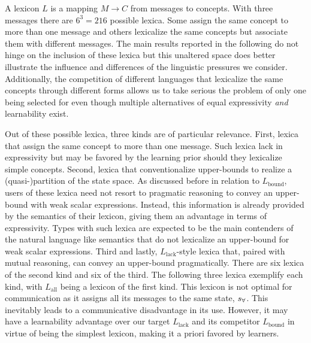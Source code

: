 \documentclass[a4paper, 11pt]{article}
\newcommand{\state}{\ensuremath{s}\xspace}		%
\newcommand{\mystate}[1]{\ensuremath{\state_{\text{#1}}}\xspace} %
\newcommand{\mylang}[1]{\ensuremath{L_{\text{#1}}}\xspace} %
\newcommand{\Messgs}{\ensuremath{M}\xspace}		%
\newcommand{\sall}{\mystate{\ensuremath{\forall}}}
\newcommand{\Lall}{\mylang{all}}
\newcommand{\Lbound}{\mylang{bound}}
\newcommand{\Llack}{\mylang{lack}}
\begin{document}
A lexicon $L$ is a mapping $\Messgs \rightarrow C$ from messages to concepts. With three
messages there are $6^3 = 216$ possible lexica. Some assign the same concept to more than one message and others lexicalize the same concepts but associate them with different messages. The main results reported in the following do not hinge on the inclusion of these lexica but this unaltered space does better illustrate the influence and differences of the linguistic pressures we consider. Additionally, the competition of different languages that lexicalize the same concepts through different forms allows us to take serious the problem of only one being selected for even though multiple alternatives of equal expressivity {\em and} learnability exist.

Out of these possible lexica, three kinds are of particular relevance. First, lexica that assign the same concept to more than one message. Such lexica lack in expressivity but may be favored by the learning prior should they lexicalize simple concepts. Second, lexica that conventionalize upper-bounds to realize a (quasi-)partition of the state space. As discussed before in relation to $\Lbound$, users of these lexica need not resort to pragmatic reasoning to convey an upper-bound with weak scalar expressions. Instead, this information is already provided by the semantics of their lexicon, giving them an advantage in terms of expressivity. Types with such lexica are expected to be the main contenders of the natural language like semantics that do not lexicalize an upper-bound for weak scalar expressions. Third and lastly, $\Llack$-style lexica that, paired with mutual reasoning, can convey an upper-bound pragmatically. There are six lexica of the second kind and six of the third. The following three lexica exemplify each kind, with $\Lall$ being a lexicon of the first kind. This lexicon is not optimal for communication as it assigns all its messages to the same state, $\sall$. This inevitably leads to a communicative disadvantage in its use. However, it may have a learnability advantage over our target $\Llack$ and its competitor $\Lbound$ in virtue of being the simplest lexicon, making it a priori favored by learners.
\end{document}
